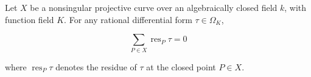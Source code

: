 Let $X$ be a nonsingular projective curve over an algebraically closed field $k$, with function field $K$. For any rational differential form $\tau \in \Omega_K$,

$$\sum_{P \in X} \operatorname{res}_P \tau = 0$$

where $\operatorname{res}_P \tau$ denotes the residue of $\tau$ at the closed point $P \in X$.
